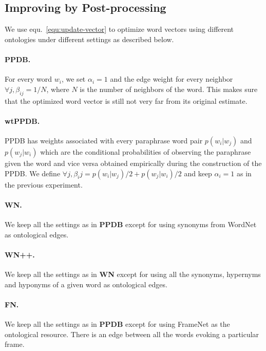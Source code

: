\documentclass[11pt]{article}
\begin{document}
\subsection{Improving by Post-processing}
\label{sec:post-proc}

We use equ.~\ref{equ:update-vector} to optimize word vectors using different ontologies
under different settings as described below.

\paragraph{PPDB.} For every word $w_i$, we set $\alpha_i = 1$ and the edge weight for every neighbor $\forall j, \beta_{ij} = 1/N$, where $N$ is the number of neighbors of the word. This makes sure that the optimized word vector is still not very far from its original estimate.

\paragraph{wtPPDB.} PPDB has weights associated with every paraphrase word pair $p(w_i | w_j)$ and $p(w_j |w_i)$ which are the conditional probabilities of 
observing the paraphrase given the word and vice versa obtained empirically during the construction of the PPDB. We define $\forall j, \beta_ij = p(w_i | w_j)/2 + p(w_j |w_i)/2$ and keep $\alpha_i = 1$ as in the previous experiment.

\paragraph{WN.} We keep all the settings as in \textbf{PPDB} except for using 
synonyms from WordNet as ontological edges.

\paragraph{WN++.} We keep all the settings as in \textbf{WN} except for using all 
the synonyms, hypernyms and hyponyms of a given word as ontological edges.

\paragraph{FN.} We keep all the settings as in \textbf{PPDB} except for using 
FrameNet as the ontological resource. There is an edge between all the words evoking
a particular frame.
\end{document}
